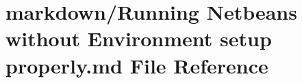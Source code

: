 \hypertarget{Running_01Netbeans_01without_01Environment_01setup_01properly_8md}{\section{markdown/\-Running Netbeans without Environment setup properly.\-md File Reference}
\label{Running_01Netbeans_01without_01Environment_01setup_01properly_8md}
}
